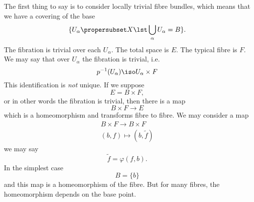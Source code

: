 The first thing to say is to consider locally trivial fibre
bundles, which means that we have a covering of the base
\begin{equation}
\{U_{\alpha}\propersubset X\lst\bigcup_{\alpha}U_{\alpha}=B\}.
\end{equation}
The fibration is trivial over each $U_{\alpha}$. The total space
is $E$. The typical fibre is $F$. We may say that over
$U_{\alpha}$ the fibration is trivial, i.e.
\begin{equation}
p^{-1}(U_{\alpha})\iso U_{\alpha}\times F
\end{equation}
This identification is \emph{not} unique. If we suppose
\begin{equation}
E=B\times F,
\end{equation}
or in other words the fibration is trivial, then there is a map
\begin{equation}
B\times F\to E
\end{equation}
which is a homeomorphism and transforms fibre to fibre. We may
consider a map
\begin{equation}
\begin{array}{c}
B\times F\to B\times F\\
(b,f)\mapsto(b,\widetilde{f})
\end{array}
\end{equation}
we may say
\begin{equation}
\widetilde{f}=\varphi(f,b).
\end{equation}
In the simplest case
\begin{equation}
B=\{b\}
\end{equation}
and this map is a homeomorphism of the fibre. But for many
fibres, the homeomorphism depends on the base point.

